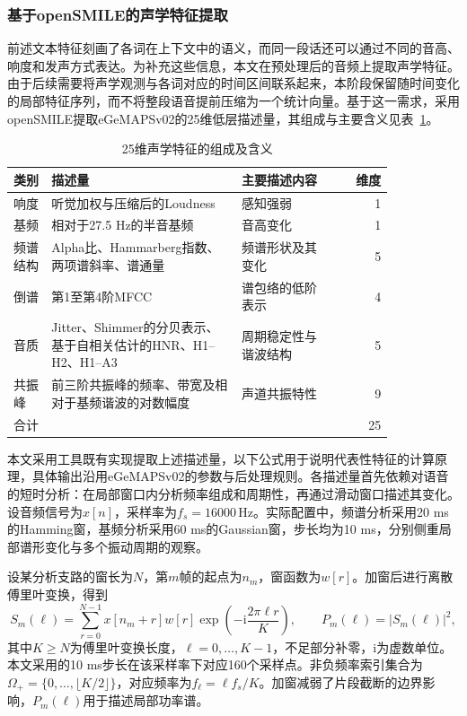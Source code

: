 \subsubsection{基于openSMILE的声学特征提取}

前述文本特征刻画了各词在上下文中的语义，而同一段话还可以通过不同的音高、响度和发声方式表达。为补充这些信息，本文在预处理后的音频上提取声学特征。由于后续需要将声学观测与各词对应的时间区间联系起来，本阶段保留随时间变化的局部特征序列，而不将整段语音提前压缩为一个统计向量。基于这一需求，采用openSMILE提取eGeMAPSv02的25维低层描述量，其组成与主要含义见表~\ref{tab:p1_acoustic_groups}。

\begin{table}[htbp]
    \centering
    \caption{25维声学特征的组成及含义}
    \label{tab:p1_acoustic_groups}
    \begingroup
    \small
    \renewcommand{\arraystretch}{1.25}
    \begin{tabular}{@{}p{0.10\linewidth}p{0.5\linewidth}p{0.24\linewidth}r@{}}
        \hline
        类别 & 描述量 & 主要描述内容 & 维度\\ \hline
        响度 & 听觉加权与压缩后的Loudness & 感知强弱 & 1\\
        基频 & 相对于27.5 Hz的半音基频 & 音高变化 & 1\\
        频谱结构 & Alpha比、Hammarberg指数、两项谱斜率、谱通量 & 频谱形状及其变化 & 5\\
        倒谱 & 第1至第4阶MFCC & 谱包络的低阶表示 & 4\\
        音质 & Jitter、Shimmer的分贝表示、基于自相关估计的HNR、H1--H2、H1--A3 & 周期稳定性与谐波结构 & 5\\
        共振峰 & 前三阶共振峰的频率、带宽及相对于基频谐波的对数幅度 & 声道共振特性 & 9\\ \hline
        合计 & & & 25\\ \hline
    \end{tabular}
    \endgroup
\end{table}

本文采用工具既有实现提取上述描述量，以下公式用于说明代表性特征的计算原理，具体输出沿用eGeMAPSv02的参数与后处理规则。各描述量首先依赖对语音的短时分析：在局部窗口内分析频率组成和周期性，再通过滑动窗口描述其变化。设音频信号为$x[n]$，采样率为$f_s=16000\,\mathrm{Hz}$。实际配置中，频谱分析采用20 ms的Hamming窗，基频分析采用60 ms的Gaussian窗，步长均为10 ms，分别侧重局部谱形变化与多个振动周期的观察。

设某分析支路的窗长为$N$，第$m$帧的起点为$n_m$，窗函数为$w[r]$。加窗后进行离散傅里叶变换，得到
\begin{equation}
    S_m(\ell)=\sum_{r=0}^{N-1}x[n_m+r]w[r]
    \exp\!\left(-\mathrm{i}\frac{2\pi\ell r}{K}\right),
    \qquad P_m(\ell)=|S_m(\ell)|^2,
    \label{eq:p1_audio_spectrum}
\end{equation}
其中$K\geq N$为傅里叶变换长度，$\ell=0,\ldots,K-1$，不足部分补零，$\mathrm{i}$为虚数单位。本文采用的10 ms步长在该采样率下对应160个采样点。非负频率索引集合为$\Omega_+=\{0,\ldots,\lfloor K/2\rfloor\}$，对应频率为$f_\ell=\ell f_s/K$。加窗减弱了片段截断的边界影响，$P_m(\ell)$用于描述局部功率谱。

